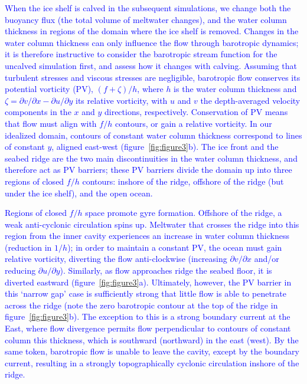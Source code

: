\documentclass[draft]{agujournal2019}
\newcommand{\blue}[1]{\textcolor{blue}{#1}}
\begin{document}
 
\textcolor{blue}{When the ice shelf is calved in the subsequent simulations, we change both the buoyancy flux (the total volume of meltwater changes), and the water column thickness in regions of the domain where the ice shelf is removed. Changes in the water column thickness can only influence the flow through barotropic dynamics; it is therefore instructive to consider the barotropic stream function for the uncalved simulation first, and assess how it changes with calving. Assuming that turbulent stresses and viscous stresses are negligible, barotropic flow conserves its potential vorticity (PV),  $(f + \zeta)/h$, where $h$ is the water column thickness and $\zeta = \partial v / \partial x - \partial u / \partial y$ its relative vorticity, with $u$ and $v$ the depth-averaged velocity components in the $x$ and $y$ directions, respectively. Conservation of PV means that flow must align with $f/h$ contours, or gain a relative vorticity. In our idealized domain, contours of constant water column thickness correspond to lines of constant $y$, aligned east-west (figure~\ref{fig:figure3}b). The ice front and the seabed ridge are the two main discontinuities in the water column thickness, and therefore act as PV barriers; these PV barriers divide the domain up into three regions of closed $f/h$ contours: inshore of the ridge, offshore of the ridge (but under the ice shelf), and the open ocean.}

\blue{Regions of closed $f/h$ space promote gyre formation. Offshore of the ridge, a weak anti-cyclonic circulation spins up. Meltwater that crosses the ridge into this region from the inner cavity experiences an increase in water column thickness (reduction in $1/h$); in order to maintain a constant PV, the ocean must gain relative vorticity, diverting the flow anti-clockwise (increasing $\partial v / \partial x$ and/or reducing $\partial u / \partial y$). Similarly, as flow approaches ridge the seabed floor, it is diverted eastward (figure~\ref{fig:figure3}a). Ultimately, however, the PV barrier in this `narrow gap' case is sufficiently strong that little flow is able to penetrate across the ridge (note the zero barotropic contour at the top of the ridge in figure~\ref{fig:figure3}b). The exception to this is a strong boundary current at the East, where flow divergence permits flow perpendicular to contours of constant column this thickness, which is southward (northward) in the east (west). By the same token, barotropic flow is unable to leave the cavity, except by the boundary current, resulting in a strongly topographically cyclonic circulation inshore of the ridge.}
\end{document}
